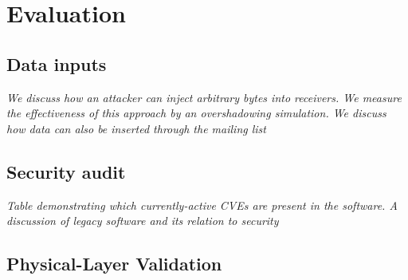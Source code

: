 \section{Evaluation}\label{sec:evaluation}

\subsection{Data inputs}

\textit{We discuss how an attacker can inject arbitrary bytes into receivers.  We measure the effectiveness of this approach by an overshadowing simulation.  We discuss how data can also be inserted through the mailing list}

\subsection{Security audit}
\textit{Table demonstrating which currently-active CVEs are present in the software. A discussion of legacy software and its relation to security}

\subsection{Physical-Layer Validation}

